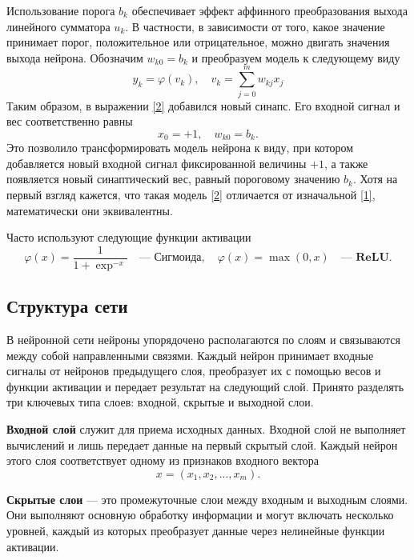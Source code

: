 \documentclass[12pt, a4paper]{article}
\renewcommand{\phi}{\varphi}
\begin{document}
Использование порога $b_k$ обеспечивает эффект аффинного преобразования выхода линейного сумматора $u_k$. В частности, в зависимости от того, какое значение принимает порог,  положительное или отрицательное, можно двигать значения выхода нейрона. Обозначим $w_{k0} = b_k$ и преобразуем модель к следующему виду
\begin{equation}
	y_k = \phi(v_k), \quad v_k = \sum_{j = 0}^{m} w_{kj}x_j 
	\label{2}
\end{equation}
 Таким образом, в выражении \eqref{2} добавился новый синапс. Его входной сигнал и вес соответственно равны
 \begin{equation*}
 	x_0 = +1, \quad w_{k0} = b_k.
 \end{equation*}
 Это позволило трансформировать модель нейрона к виду, при котором добавляется новый входной сигнал фиксированной величины $+1$, а также появляется новый синаптический вес, равный пороговому значению $b_k$. Хотя на первый взгляд кажется, что такая модель \eqref{2} отличается от изначальной \eqref{1}, математически они эквивалентны.
  
 Часто используют следующие функции активации
 \begin{equation*}
 	\phi(x) =  \dfrac{1}{1+\exp^{-x}} \quad\textbf{--- Сигмоида}, \quad
 	\phi(x) =  \max(0, x)  \quad\textbf{--- ReLU}.
 \end{equation*}
\newpage
\subsection{Структура сети}

В нейронной сети нейроны упорядочено располагаются по слоям и связываются между собой  направленными связями. Каждый нейрон принимает входные сигналы от нейронов предыдущего слоя, преобразует их с помощью весов и функции активации и передает результат на следующий слой.  Принято разделять три ключевых типа слоев: входной, скрытые и выходной слои.

\textbf{Входной слой} служит для приема исходных данных.  Входной слой не выполняет вычислений и лишь передает данные на первый скрытый слой. Каждый нейрон этого слоя соответствует одному из признаков входного вектора
  \begin{equation}
 	 x = (x_1, x_2, ..., x_m).
 	 \label{3}
 \end{equation}

\textbf{Скрытые слои} --- это промежуточные слои между входным и выходным слоями. Они выполняют основную обработку информации и могут включать несколько уровней, каждый из которых преобразует данные через нелинейные функции активации.
\end{document}
